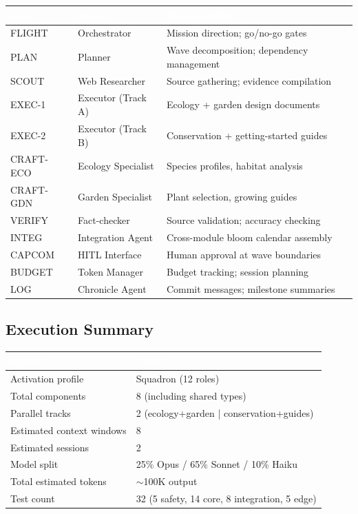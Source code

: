 \documentclass[11pt,letterpaper]{article}
\newcommand{\tableheader}[1]{\textbf{\sffamily\textcolor{white}{#1}}}
\begin{document}
\begin{center}
\begin{tabularx}{\textwidth}{L{2cm}L{3cm}X}
\toprule
{}
\tableheader{Role} & \tableheader{Agent} & \tableheader{Responsibility} \\
\midrule
FLIGHT & Orchestrator & Mission direction; go/no-go gates \\
PLAN & Planner & Wave decomposition; dependency management \\
SCOUT & Web Researcher & Source gathering; evidence compilation \\
EXEC-1 & Executor (Track A) & Ecology + garden design documents \\
EXEC-2 & Executor (Track B) & Conservation + getting-started guides \\
CRAFT-ECO & Ecology Specialist & Species profiles, habitat analysis \\
CRAFT-GDN & Garden Specialist & Plant selection, growing guides \\
VERIFY & Fact-checker & Source validation; accuracy checking \\
INTEG & Integration Agent & Cross-module bloom calendar assembly \\
CAPCOM & HITL Interface & Human approval at wave boundaries \\
BUDGET & Token Manager & Budget tracking; session planning \\
LOG & Chronicle Agent & Commit messages; milestone summaries \\
\bottomrule
\end{tabularx}
\end{center}

\subsection{Execution Summary}

\begin{center}
\begin{tabularx}{\textwidth}{L{5cm}X}
\toprule
{}
\tableheader{Metric} & \tableheader{Value} \\
\midrule
Activation profile & Squadron (12 roles) \\
Total components & 8 (including shared types) \\
Parallel tracks & 2 (ecology+garden | conservation+guides) \\
Estimated context windows & 8 \\
Estimated sessions & 2 \\
Model split & 25\% Opus / 65\% Sonnet / 10\% Haiku \\
Total estimated tokens & $\sim$100K output \\
Test count & 32 (5 safety, 14 core, 8 integration, 5 edge) \\
\bottomrule
\end{tabularx}
\end{center}
\end{document}
